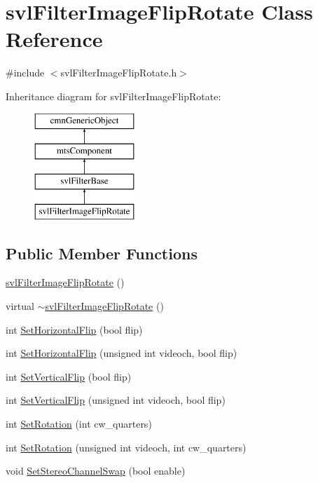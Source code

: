 \hypertarget{classsvl_filter_image_flip_rotate}{\section{svl\-Filter\-Image\-Flip\-Rotate Class Reference}
\label{classsvl_filter_image_flip_rotate}
}


{\ttfamily \#include $<$svl\-Filter\-Image\-Flip\-Rotate.\-h$>$}

Inheritance diagram for svl\-Filter\-Image\-Flip\-Rotate\-:\begin{figure}[H]
\begin{center}
\leavevmode
\includegraphics[height=4.000000cm]{db/d13/classsvl_filter_image_flip_rotate}
\end{center}
\end{figure}
\subsection*{Public Member Functions}
\begin{DoxyCompactItemize}
\item 
\hyperlink{classsvl_filter_image_flip_rotate_ab379e8505822377250bea77bc6851f34}{svl\-Filter\-Image\-Flip\-Rotate} ()
\item 
virtual \hyperlink{classsvl_filter_image_flip_rotate_ae90457d63160857f818ba5952f4568a0}{$\sim$svl\-Filter\-Image\-Flip\-Rotate} ()
\item 
int \hyperlink{classsvl_filter_image_flip_rotate_a607a8c052166c06c9bd70c7ff5def50e}{Set\-Horizontal\-Flip} (bool flip)
\item 
int \hyperlink{classsvl_filter_image_flip_rotate_a63abf3dc9d7d07d09965c04192261080}{Set\-Horizontal\-Flip} (unsigned int videoch, bool flip)
\item 
int \hyperlink{classsvl_filter_image_flip_rotate_ad0b482634c2496543b12481ea3a58348}{Set\-Vertical\-Flip} (bool flip)
\item 
int \hyperlink{classsvl_filter_image_flip_rotate_a10d1b928454a9d3be595ad9150449aac}{Set\-Vertical\-Flip} (unsigned int videoch, bool flip)
\item 
int \hyperlink{classsvl_filter_image_flip_rotate_a2aeda68e2a3e158c88fde836b4d66143}{Set\-Rotation} (int cw\-\_\-quarters)
\item 
int \hyperlink{classsvl_filter_image_flip_rotate_adfa2517f9040fcc09661aef1a6280964}{Set\-Rotation} (unsigned int videoch, int cw\-\_\-quarters)
\item 
void \hyperlink{classsvl_filter_image_flip_rotate_a040fd1fe8661d10d546ddec0f3ef5fb9}{Set\-Stereo\-Channel\-Swap} (bool enable)
\end{DoxyCompactItemize}
